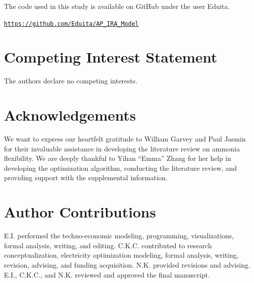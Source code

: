 \documentclass{article}
\begin{document}
The code used in this study is available on GitHub under the user Eduita. 

\href{https://github.com/Eduita/AP_IRA_Model}{\texttt{https://github.com/Eduita/AP_IRA_Model}}




\section*{Competing Interest Statement}
 
The authors declare no competing interests.

\section*{Acknowledgements}

We want to express our heartfelt gratitude to William Garvey and Paul Jasmin for their invaluable assistance in developing the literature review on ammonia flexibility. We are deeply thankful to Yihan ``Emma'' Zhang for her help in developing the optimization algorithm, conducting the literature review, and providing support with the supplemental information.

\section*{Author Contributions}

E.I. performed the techno-economic modeling, programming, visualizations, formal analysis, writing, and editing. C.K.C. contributed to research conceptualization, electricity optimization modeling, formal analysis, writing, revision, advising, and funding acquisition. N.K. provided revisions and advising. E.I., C.K.C., and N.K. reviewed and approved the final manuscript.
\end{document}
